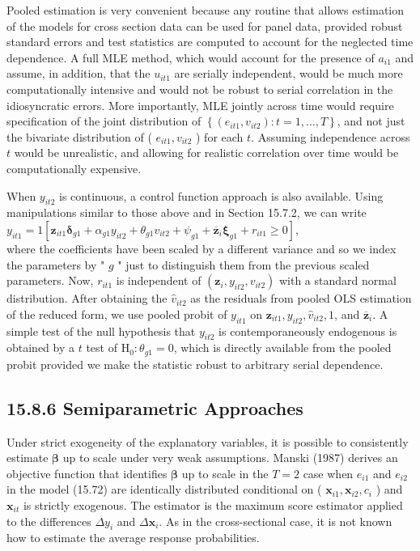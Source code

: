 \documentclass[10pt]{article}
\begin{document}
Pooled estimation is very convenient because any routine that allows estimation of the models for cross section data can be used for panel data, provided robust standard errors and test statistics are computed to account for the neglected time dependence. A full MLE method, which would account for the presence of $a_{i 1}$ and assume, in addition, that the $u_{i t 1}$ are serially independent, would be much more computationally intensive and would not be robust to serial correlation in the idiosyncratic errors. More importantly, MLE jointly across time would require specification of the joint distribution of $\left\{\left(e_{i t 1}, v_{i t 2}\right): t=1, \ldots, T\right\}$, and not just the bivariate distribution of ( $e_{i t 1}, v_{i t 2}$ ) for each $t$. Assuming independence across $t$ would be unrealistic, and allowing for realistic correlation over time would be computationally expensive.

When $y_{i t 2}$ is continuous, a control function approach is also available. Using manipulations similar to those above and in Section 15.7.2, we can write\\
$y_{i t 1}=1\left[\mathbf{z}_{i t 1} \boldsymbol{\delta}_{g 1}+\alpha_{g 1} y_{i t 2}+\theta_{g 1} v_{i t 2}+\psi_{g 1}+\overline{\mathbf{z}}_{i} \boldsymbol{\xi}_{g 1}+r_{i t 1} \geq 0\right]$,\\
where the coefficients have been scaled by a different variance and so we index the parameters by " $g$ " just to distinguish them from the previous scaled parameters. Now, $r_{i t 1}$ is independent of $\left(\mathbf{z}_{i}, y_{i t 2}, v_{i t 2}\right)$ with a standard normal distribution. After obtaining the $\hat{v}_{i t 2}$ as the residuals from pooled OLS estimation of the reduced form, we use pooled probit of $y_{i t 1}$ on $\mathbf{z}_{i t 1}, y_{i t 2}, \hat{v}_{i t 2}, 1$, and $\overline{\mathbf{z}}_{i}$. A simple test of the null hypothesis that $y_{i t 2}$ is contemporaneously endogenous is obtained by a $t$ test of $\mathrm{H}_{0}: \theta_{g 1}=0$, which is directly available from the pooled probit provided we make the statistic robust to arbitrary serial dependence.

\subsection*{15.8.6 Semiparametric Approaches}
Under strict exogeneity of the explanatory variables, it is possible to consistently estimate $\boldsymbol{\beta}$ up to scale under very weak assumptions. Manski (1987) derives an objective function that identifies $\boldsymbol{\beta}$ up to scale in the $T=2$ case when $e_{i 1}$ and $e_{i 2}$ in the model (15.72) are identically distributed conditional on ( $\mathbf{x}_{i 1}, \mathbf{x}_{i 2}, c_{i}$ ) and $\mathbf{x}_{i t}$ is strictly exogenous. The estimator is the maximum score estimator applied to the differences $\Delta y_{i}$ and $\Delta \mathbf{x}_{i}$. As in the cross-sectional case, it is not known how to estimate the average response probabilities.
\end{document}
